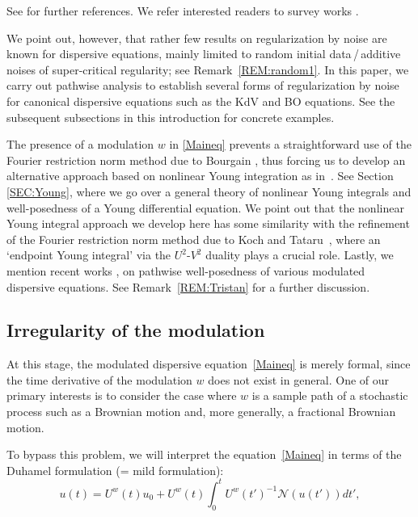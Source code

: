 \documentclass[letterpaper, 11pt,  reqno]{amsart}
\newcommand{\1}{\hspace{0.5mm}\text{I}\hspace{0.5mm}}
\newcommand{\noi}{\noindent}
\newcommand{\NN}{\mathcal{N}}
\numberwithin{equation}{section}
\numberwithin{theorem}{section}
\begin{document}
\noi
See \cite{RT} for further references.
We refer interested readers to  survey works \cite{Flan, Gess}.

We point out, however, that  rather few results 
on regularization by noise are known
for  dispersive equations, mainly limited to random initial data\,/\,additive noises of super-critical regularity;
see Remark~\ref{REM:random1}.
In this paper, we carry out pathwise analysis to establish several forms of  regularization by noise
for canonical dispersive equations
such as the KdV and BO equations.
See the subsequent subsections
in this introduction
for concrete examples.





The presence of a modulation $w$ in \eqref{Maineq} prevents  
a straightforward use of the Fourier restriction norm method
due to Bourgain \cite{BO93}, 
thus forcing us  
 to develop an alternative approach based on nonlinear Young integration as in~\cite{CG1}.  
See Section \ref{SEC:Young}, 
where we go over a general theory of nonlinear Young integrals
and well-posedness of a Young differential equation.
We point out that 
the nonlinear Young integral approach
we develop here
has 
some  similarity 
with 
the refinement of the Fourier restriction norm method
due to Koch and Tataru~\cite{KT}, 
where an `endpoint Young integral' via the $U^2$-$V^2$ duality
plays a crucial role.
Lastly, we mention recent works
\cite{Tanaka, Robert1, Robert2, Robert3, Robert4}, 
on pathwise well-posedness of  various modulated dispersive equations.
See Remark~\ref{REM:Tristan}
for a further discussion.




\subsection{Irregularity of the modulation}

At this stage, 
the modulated dispersive equation~\eqref{Maineq} 
is merely formal, since the time derivative of the modulation  $w$ does not exist in general.
One of our primary interests
is to  consider the  case where $w$ is a sample path of a stochastic process
such as a Brownian motion and, more generally,  a fractional Brownian motion. 

To bypass this problem, 
 we will interpret the equation~\eqref{Maineq} in terms of the 
 Duhamel formulation (= mild formulation):
\begin{equation}
u(t) = U^w(t) u_0 +  U^w({t}) \int_0^t  U^w({t'})^{-1}\NN( u(t') ) dt', 
\label{mild1}
\end{equation}
\end{document}
